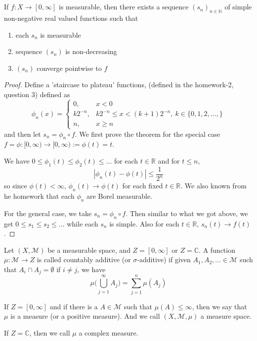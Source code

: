 
\chapter{}

\begin{theorem}
  If $f: X \to [0, \infty]$ is measurable, then there exists a sequence $(s_n)_{ n \in \mathbb{N}}$ of simple non-negative real valued functions such that \begin{enumerate}[label=\roman*]
    \item each $s_n$ is measurable
    \item sequence $(s_n)$ is non-decreasing
    \item $(s_n)$ converge pointwise to $f$
  \end{enumerate}
\end{theorem}
\begin{proof}
  Define a 'staircase to plateau' functions, (defined in the homework-2, question 3) defined as \[
    \phi_n(x) = \begin{cases}
      0, & x < 0 \\ 
      k2^{-n}, & k2^{-n} \le x < (k+1)2^{-n}, \ k \in \{0, 1, 2, \ldots,  \} \\ 
      n, & x \ge n
    \end{cases}
  \]
  and then let $s_n = \phi_n \circ f$. We first prove the theorem for the special case $f = \phi : [0, \infty) \to [0, \infty):= \phi(t) = t$.

  We have $0 \le \phi_1(t) \le \phi_2(t) \le \ldots$ for each $t \in \mathbb{R}$ and for $t \le n$, \[
    |\phi_n(t) - \phi(t)| \le \frac{1}{2^n}
  \]
   so since $\phi(t) < \infty$, $\phi_n(t) \to \phi(t)$ for each fixed $ t \in \mathbb{R}$. We also known from he homework that each $ \phi_n$ are Borel measurable. 

   For the general case, we take $s_n = \phi_n \circ f$. Then similar to what we got above, we get $0 \le s_1 \le s_2 \le \ldots$ while each $s_n$ is simple. Also for each $ t \in \mathbb{R}$, $s_n(t) \to f(t)$.
\end{proof}

\begin{definition}
  Let $(X, \mathcal{M})$ be a measurable space, and $Z = [0, \infty]$ or $Z = \mathbb{C}$. A function $\mu: \mathcal{M} \to Z$ is called countably additive (or $\sigma$-additive) if given $A_1, A_2, \ldots \in \mathcal{M}$ such that $A_i \cap A_j = \emptyset$ if $i \neq j$, we have \[
    \mu \Big( \bigcup_{j = 1}^{\infty} A_j\Big) = \sum_{j = 1}^{n} \mu(A_j)
  \]

  If $Z = [0, \infty]$ and  if there is a $A \in \mathcal{M}$ such that $\mu(A) \le \infty$, then we say that $\mu$ is a measure (or a positive measure). And we call $(X, \mathcal{M}, \mu)$ a measure space.

  If $Z = \mathbb{C}$, then we call $\mu$ a complex measure.
\end{definition}

